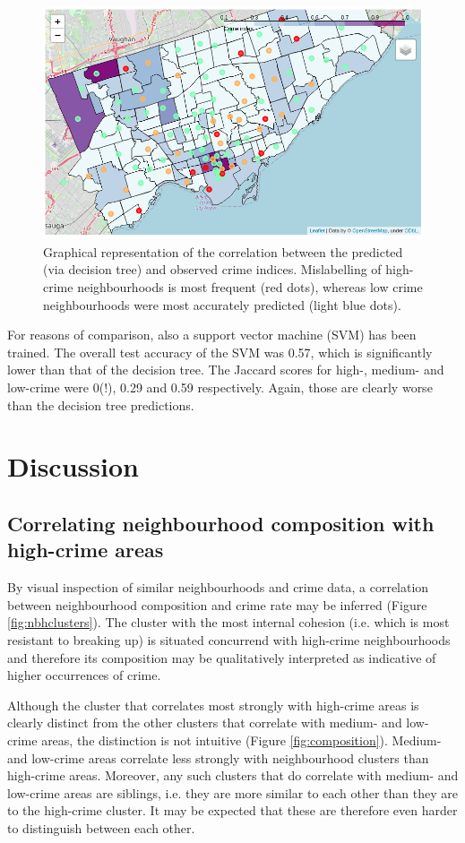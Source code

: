 \documentclass{article}
\begin{document}
\begin{figure}[ht]
\centering
 \includegraphics[width=\textwidth]{pics/prediction.png}
 \caption{Graphical representation of the correlation between the predicted (via decision tree) and observed crime indices. Mislabelling of high-crime neighbourhoods is most frequent (red dots), whereas low crime neighbourhoods were most accurately predicted (light blue dots).}\label{fig:predicted}
\end{figure} 

For reasons of comparison, also a support vector machine (SVM) has been trained. The overall test accuracy of the SVM was 0.57, which is significantly lower than that of the decision tree. The Jaccard scores for high-, medium- and low-crime were 0(!), 0.29 and 0.59 respectively. Again, those are clearly worse than the decision tree predictions.

\section{Discussion}
\subsection{Correlating neighbourhood composition with high-crime areas}
By visual inspection of similar neighbourhoods and crime data, a correlation between neighbourhood composition and crime rate may be inferred (Figure \ref{fig:nbhclusters}). The cluster with the most internal cohesion (i.e. which is most resistant to breaking up) is situated concurrend with high-crime neighbourhoods and therefore its composition may be qualitatively interpreted as indicative of higher occurrences of crime.

Although the cluster that correlates most strongly with high-crime areas is clearly distinct from the other clusters that correlate with medium- and low-crime areas, the distinction is not intuitive (Figure \ref{fig:composition}). Medium- and low-crime areas correlate less strongly with neighbourhood clusters than high-crime areas. Moreover, any such clusters that do correlate with medium- and low-crime areas are siblings, i.e. they are more similar to each other than they are to the high-crime cluster. It may be expected that these are therefore even harder to distinguish between each other.
\end{document}
